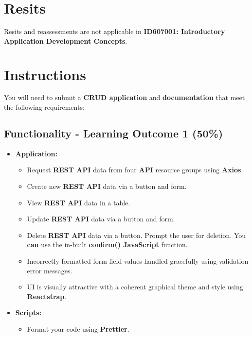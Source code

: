\documentclass{article}
\begin{document}
\section*{Resits}
Resits and reassessments are not applicable in \textbf{ID607001: Introductory Application Development Concepts}. 
\newpage

\section*{Instructions}
You will need to submit a \textbf{CRUD application} and \textbf{documentation} that meet the following requirements: 

\subsection*{Functionality - Learning Outcome 1 (50\%)}
\begin{itemize}
	\item \textbf{Application:}
		\begin{itemize}
		\item Request \textbf{REST API} data from four \textbf{API} resource groups using \textbf{Axios}.
		\item Create new \textbf{REST API} data via a button and form. 
		\item View \textbf{REST API} data in a table.
		\item Update \textbf{REST API} data via a button and form. 
		\item Delete \textbf{REST API} data via a button.
		Prompt the user for deletion. You \textbf{can} use the in-built \textbf{confirm() JavaScript} function. 
		\item Incorrectly formatted form field values handled gracefully using validation error messages.
		\item UI is visually attractive with a coherent graphical theme and style using \textbf{Reactstrap}.	
	\end{itemize}
	\item \textbf{Scripts:}
	\begin{itemize}
		\item Format your code using \textbf{Prettier}.
	\end{itemize}
\end{itemize}
\end{document}
